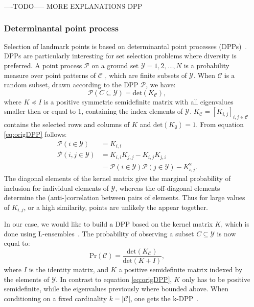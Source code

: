\documentclass[preprint,12pt]{elsarticle}
\begin{document}
----TODO-----
MORE EXPLANATIONS DPP


\subsubsection{Determinantal point process}
Selection of landmark points is based on determinantal point processes (DPPs)~\cite{kulesza2012determinantal}. DPPs are particularly interesting for set selection problems where diversity is preferred. A point process $\mathcal{P}$ on a ground set $\mathcal{Y} = {1,2,...,N}$ is a probability measure over point patterns of $\mathcal{C}$ , which are finite subsets of $\mathcal{Y}$. When $\mathcal{C}$ is a random subset, drawn according to the DPP $\mathcal{P}$, we have:
\begin{equation}
\label{eq:origDPP}
	\mathcal{P}(C \subseteq \mathcal{Y}) = \mathrm{det}(K_{\mathcal{C}}),
\end{equation}
where $K \preceq I$ is a positive symmetric semidefinite matrix with all eigenvalues smaller then or equal to 1, containing the index elements of $\mathcal{Y}$. $K_{\mathcal{C}} = [K_{i,j}]_{i,j \in \mathcal{C}}$ contains the selected rows and columns of $K$ and $\mathrm{det}(K_{\emptyset}) = 1$. From equation \eqref{eq:origDPP} follows:
\begin{align}
	\mathcal{P}(i \in \mathcal{Y}) &= K_{i,i} \\
	\mathcal{P}(i,j \in \mathcal{Y}) &= K_{i,i}K_{j,j} - K_{i,j}K_{j,i}\\
	\label{eq:KDPP}
	&= \mathcal{P}(i \in \mathcal{Y})\mathcal{P}(j \in \mathcal{Y}) - K_{i,j}^2.
\end{align}
The diagonal elements of the kernel matrix give the marginal probability of inclusion for individual elements of $\mathcal{Y}$, whereas the off-diagonal elements determine the (anti-)correlation between pairs of elements. Thus for large values of $K_{i,j}$, or a high similarity, points are unlikely the appear together. 

In our case, we would like to build a DPP based on the kernel matrix $K$, which is done using L-ensembles~\cite{borodin2009determinantal}. The probability of observing a subset $C \subseteq \mathcal{Y}$ is now equal to:
\begin{equation}
	\mathrm{Pr}(\mathcal{C}) = \frac{\mathrm{det}(K_{\mathcal{C}})}{\mathrm{det}(K + I)},
\end{equation}
where $I$ is the identity matrix, and $K$ a positive semidefinite matrix  indexed by the elements of $\mathcal{Y}$. In contrast to equation \eqref{eq:origDPP}, $K$ only has to be positive semidefinite, while the eigenvalues previously where bounded above. When conditioning on a fixed cardinality $k = |\mathcal{C}|$, one gets the k-DPP~\cite{kulesza2011k}.
\end{document}
